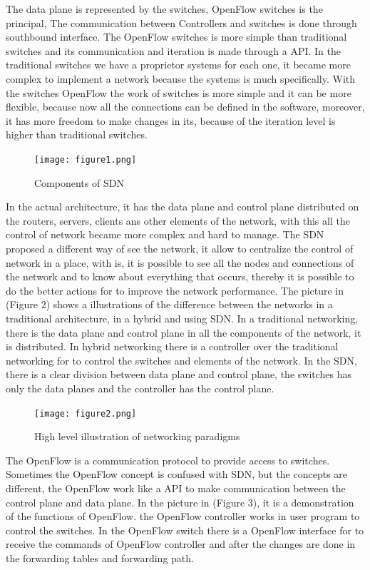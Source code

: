 \documentclass[12pt]{article}
\begin{document}
The data plane is represented by the switches, OpenFlow switches is the principal, The communication between Controllers and switches is done through southbound interface. The OpenFlow switches is more simple than traditional switches and its communication and iteration is made through a API. In the traditional switches we have a proprietor systems for each one, it became more complex to implement a network because the systems is much specifically. With the switches OpenFlow the work of switches is more simple and it can be more flexible, because now all the connections can be defined in the software, moreover, it has more freedom to make changes in its, because of the iteration level is higher than traditional switches.

\begin{figure}[ht]
\centering
\texttt{[image: figure1.png]}
\caption{Components of SDN}
\label{figure1}
\end{figure}

In the actual architecture, it has the data plane and control plane distributed on the routers, servers, clients ans other elements of the network, with this all the control of network became more complex and hard to manage. The SDN proposed a different way of see the network, it allow to centralize the control of network in a place, with is, it is possible to see all the nodes and connections of the network and to know about everything that occurs, thereby it is possible to do the better actions for to improve the network performance. The picture in (Figure 2) shows a illustrations of the difference between the networks in a traditional architecture, in a hybrid and using SDN. In a traditional networking, there is the data plane and control plane in all the components of the network, it is distributed. In hybrid networking there is a controller over the traditional networking for to control the switches and elements of the network. In the SDN, there is a clear division between data plane and control plane, the switches has only the data planes and the controller has the control plane.

\begin{figure}[ht]
\centering
\texttt{[image: figure2.png]}
\caption{High level illustration of networking paradigms}
\label{figure 2: High level illustration of networking paradigms}
\end{figure}

The OpenFlow is a communication protocol to provide access to switches. Sometimes the OpenFlow concept is confused with SDN, but the concepts are different, the OpenFlow work like a API to make communication between the control plane and data plane. In the picture in (Figure 3), it is a demonstration of the functions of OpenFlow. the OpenFlow controller works in user program to control the switches. In the OpenFlow switch there is a OpenFlow interface for to receive the commands of OpenFlow controller and after the changes are done in the forwarding tables and forwarding path.
\end{document}
